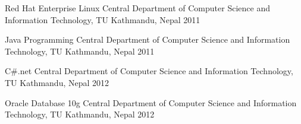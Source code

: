 

\begin{cvhonors}

  \cvhonor
    {Red Hat Enterprise Linux} %
    {Central Department of Computer Science and Information Technology, TU} %
    {Kathmandu, Nepal} %
    {2011} %

  \cvhonor
    {Java Programming} %
    {Central Department of Computer Science and Information Technology, TU} %
    {Kathmandu, Nepal} %
    {2011} %

  \cvhonor
    {C\#.net} %
    {Central Department of Computer Science and Information Technology, TU} %
    {Kathmandu, Nepal} %
    {2012} %

  \cvhonor
    {Oracle Database 10g} %
    {Central Department of Computer Science and Information Technology, TU} %
    {Kathmandu, Nepal} %
    {2012} %

\end{cvhonors}
